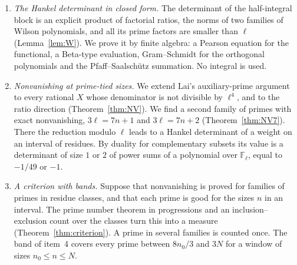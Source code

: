 \documentclass[11pt]{amsart}
\theoremstyle{definition}
\theoremstyle{remark}
\numberwithin{equation}{section}
\newcommand{\Z}{\mathbb Z}
\newcommand{\F}{\mathbb F}
\begin{document}
\begin{enumerate}[leftmargin=*]
 finite set, we prove $J_n(a,b,X)\ne0$ at every point with $a\in\Z_{(\ell)}$, $b$ an $\ell$-adic unit and
 $\ell^3X\in\Z_{(\ell)}$ (Theorem~\ref{thm:B83}). So a prime is good for every size $n$ in an interval, and not for one
 size only. The proof shows that a reduced Gram matrix is nonsingular modulo $\ell$. This matrix is block triangular. Its integral blocks are small matrices of rational
 constants with explicit determinants (Lemmas~\ref{lem:U83}, \ref{lem:blockA} and~\ref{lem:blockC}). Its half-integral block
 is, modulo $\ell$, the Hankel matrix of the functional $x^e\mapsto eB_{e-1}$ against the cube of a falling factorial
 (Lemma~\ref{lem:G3}). We obtain this by Faulhaber's formula and four sums of harmonic numbers, and not by analysis.
\item \emph{The Hankel determinant in closed form.} The determinant of the half-integral block is an explicit
 product of factorial ratios, the norms of two families of Wilson polynomials, and all its prime factors are
 smaller than $\ell$ (Lemma~\ref{lem:W}). We prove it by finite algebra: a Pearson equation for the functional, a
 Beta-type evaluation, Gram--Schmidt for the orthogonal polynomials and the Pfaff--Saalschütz summation. No integral
 is used.
\item \emph{Nonvanishing at prime-tied sizes.} We extend Lai's auxiliary-prime argument to every rational $X$ whose
 denominator is not divisible by $\ell^4$, and to the ratio direction (Theorem~\ref{thm:NV}). We find a second family
 of primes with exact nonvanishing, $3\ell=7n+1$ and $3\ell=7n+2$ (Theorem~\ref{thm:NV7}). There the reduction
 modulo $\ell$ leads to a Hankel determinant of a weight on an interval of residues. By duality for complementary
 subsets its value is a determinant of size $1$ or $2$ of power sums of a polynomial over $\F_\ell$, equal to
 $-1/49$ or $-1$.
\item \emph{A criterion with bands.} Suppose that nonvanishing is proved for families of primes in residue classes,
 and that each prime is good for the sizes $n$ in an interval. The prime number theorem in progressions and an
 inclusion--exclusion count over the classes turn this into a measure (Theorem~\ref{thm:criterion}). A prime in several families is counted once.
 The band of item~4 covers every prime between $8n_0/3$ and $3N$ for a window of sizes $n_0\le n\le N$.
\end{enumerate}
\end{document}
